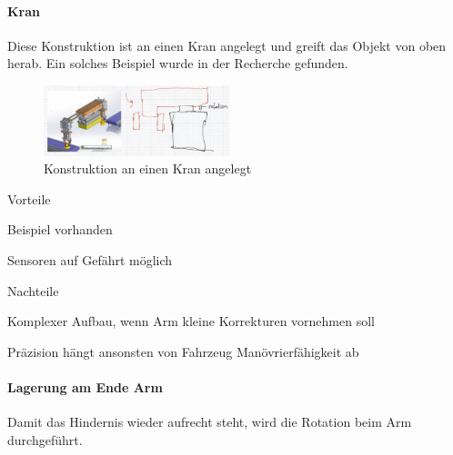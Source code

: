 \documentclass[../main.tex]{subfiles}
\begin{document}
\paragraph{Kran}
Diese Konstruktion ist an einen Kran angelegt und greift das Objekt von oben herab. Ein solches Beispiel wurde in der Recherche gefunden.

\begin{figure}[H]
        \centering
        \includegraphics[width=0.48\textwidth]{img/technologierecherche/Rotation/seitlich_mit_rotation.jpg}
        \caption[Konstruktion an einen Kran angelegt]{Konstruktion an einen Kran angelegt \footnotemark} 
        \label{img:tech_seitlich_mit_rotation}
\end{figure}

\begin{minipage}[t]{0.48\textwidth}
    \begin{items}
          \item [Vorteile]
          \item Beispiel vorhanden
          \item Sensoren auf Gefährt möglich
    \end{items}
\end{minipage}
\hfill
\begin{minipage}[t]{0.48\textwidth}
    \begin{items}
          \item [Nachteile]
          \item Komplexer Aufbau, wenn Arm kleine Korrekturen vornehmen soll
          \item Präzision hängt ansonsten von Fahrzeug Manövrierfähigkeit ab
    \end{items}
\end{minipage}
\newpage
\paragraph{Lagerung am Ende Arm}
Damit das Hindernis wieder aufrecht steht, wird die Rotation beim Arm durchgeführt. 
\end{document}
